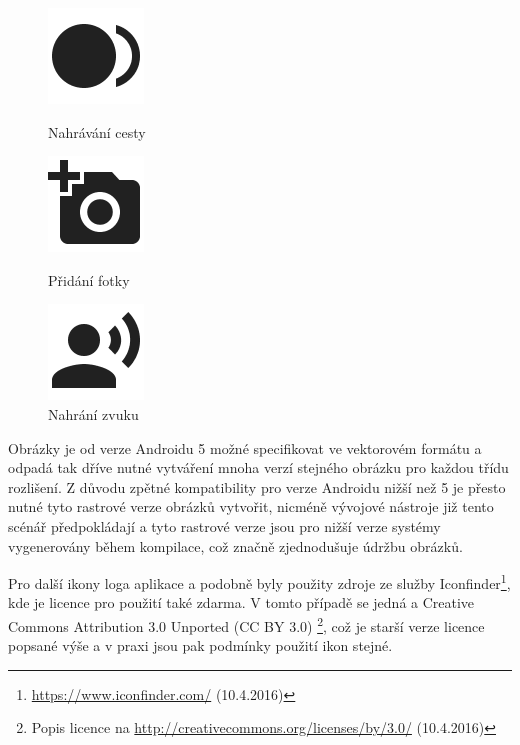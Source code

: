 \documentclass[czech,master,public,dept460,male,java,cpdeclaration]{diploma}
\begin{document}
\begin{figure}[H]
  \centering
  \includegraphics[scale=0.2]{img/record.png}
  \caption{Nahrávání cesty}\label{fig:record}
\endminipage\hfill
{}
  \centering
  \includegraphics[scale=0.2]{img/camera.png}
  \caption{Přidání fotky}\label{fig:camera}
\endminipage\hfill
{}%
  \centering
  \includegraphics[scale=0.2]{img/recordsound.png}
  \caption{Nahrání zvuku}\label{fig:recordsound}
\endminipage
\end{figure}

Obrázky je od verze Androidu 5 možné specifikovat ve vektorovém formátu a odpadá tak dříve
nutné vytváření mnoha verzí stejného obrázku pro každou třídu rozlišení.
Z důvodu zpětné kompatibility pro verze Androidu nižší než 5 je přesto nutné tyto rastrové verze obrázků
vytvořit, nicméně vývojové nástroje již tento scénář předpokládají a tyto rastrové verze jsou
pro nižší verze systémy vygenerovány během kompilace, což značně zjednodušuje údržbu obrázků.



Pro další ikony loga aplikace a podobně byly použity zdroje ze služby
Iconfinder\footnote{\url{https://www.iconfinder.com/}  (10.4.2016)}, kde je licence pro použití také zdarma. V tomto
případě se jedná a Creative Commons Attribution 3.0 Unported (CC BY 3.0)
\footnote{Popis licence na \url{http://creativecommons.org/licenses/by/3.0/}  (10.4.2016)}, což je starší verze
licence popsané výše a v praxi jsou pak podmínky použití ikon stejné.




\end{document}
